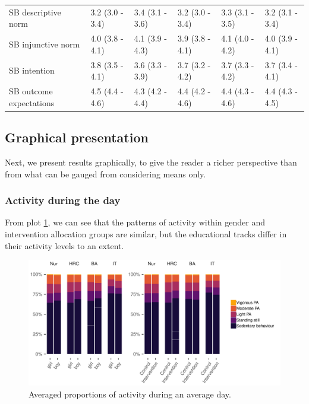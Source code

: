 \documentclass[english,floatsintext,]{apa6}
\theoremstyle{definition}
\theoremstyle{definition}
\theoremstyle{definition}
\theoremstyle{remark}
\begin{document}
\begin{table}[tbp]
\begin{center}
\begin{threeparttable}
\begin{tabular}{llllll}
SB descriptive norm & 3.2 (3.0 - 3.4) & 3.4 (3.1 - 3.6) & 3.2 (3.0 - 3.4) & 3.3 (3.1 - 3.5) & 3.2 (3.1 - 3.4)\\
SB injunctive norm & 4.0 (3.8 - 4.1) & 4.1 (3.9 - 4.3) & 3.9 (3.8 - 4.1) & 4.1 (4.0 - 4.2) & 4.0 (3.9 - 4.1)\\
SB intention & 3.8 (3.5 - 4.1) & 3.6 (3.3 - 3.9) & 3.7 (3.2 - 4.2) & 3.7 (3.3 - 4.2) & 3.7 (3.4 - 4.1)\\
SB outcome expectations & 4.5 (4.4 - 4.6) & 4.3 (4.2 - 4.4) & 4.4 (4.2 - 4.6) & 4.4 (4.3 - 4.6) & 4.4 (4.3 - 4.5)\\
\bottomrule
\end{tabular}
\end{threeparttable}
\end{center}
\end{table}

\subsection{Graphical presentation}\label{graphical-presentation}

Next, we present results graphically, to give the reader a richer
perspective than from what can be gauged from considering means only.

\subsubsection{Activity during the day}\label{activity-during-the-day}

From plot \ref{fig:average-day-activity-plot}, we can see that the
patterns of activity within gender and intervention allocation groups
are similar, but the educational tracks differ in their activity levels
to an extent.

\begin{figure}
\centering
\includegraphics{_baseline-manuscript_files/figure-latex/average-day-activity-plot-1.pdf}
\caption{\label{fig:average-day-activity-plot}Averaged proportions of
activity during an average day.}
\end{figure}
\end{document}
